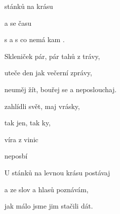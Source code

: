 

\zs
{} stánků na  krásu

 a  se času

s  a s  co nemá kam .
\ks

\zs
Skleniček pár, pár tahů z trávy,

uteče den jak večerní zprávy,

neuměj žít, bouřej se a neposlouchaj.
\ks

\zr
{} zahlídli svět, maj  vrásky,

tak  jen, tak ky,

 víra  z vinic

neposbí
\kr

\zs
U stánků na levnou krásu postávaj

a ze slov a hlasů poznávám,

jak málo jsme jim stačili dát.
\ks

\zr \kr

\zr \kr

\kp







